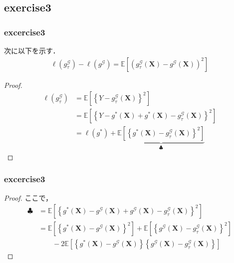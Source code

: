 \documentclass[dvipdfmx,cjk]{beamer}
\theoremstyle{example}
\begin{document}
\subsection{exercise3}
\begin{frame}
    \frametitle{excercise3}
    次に以下を示す．
    \begin{align*}
        \ell(g^\mathcal{G}_\tau)-\ell(g^\mathcal{G})=\mathbb{E}\left[(g^\mathcal{G}_\tau(\boldsymbol{X})-g^\mathcal{G}(\boldsymbol{X}))^2\right]
    \end{align*}
    \begin{proof}
        \begin{align*}
            \ell(g^\mathcal{G}_\tau) & =\mathbb{E}\left[\left\{Y-g^\mathcal{G}_\tau(\boldsymbol{X})\right\}^2\right]                                                             \\
                                     & =\mathbb{E}\left[\left\{Y-g^*(\boldsymbol{X})+g^*(\boldsymbol{X})-g^\mathcal{G}_\tau(\boldsymbol{X})\right\}^2\right]                     \\
                                     & =\ell(g^*)+\underbrace{\mathbb{E}\left[\left\{g^*(\boldsymbol{X})-g^\mathcal{G}_\tau(\boldsymbol{X})\right\}^2\right]}_\text{$\clubsuit$}
        \end{align*}
        \renewcommand{\qedsymbol}{}
    \end{proof}
\end{frame}

\begin{frame}
    \frametitle{excercise3}
    \begin{proof}
        ここで，
        \begin{align*}
            \clubsuit & = \mathbb{E}\left[\left\{g^*(\boldsymbol{X})-g^\mathcal{G}(\boldsymbol{X})+g^\mathcal{G}(\boldsymbol{X})-g^\mathcal{G}_\tau(\boldsymbol{X})\right\}^2\right]                                        \\
                      & =\mathbb{E}\left[\left\{g^*(\boldsymbol{X})-g^\mathcal{G}(\boldsymbol{X})\right\}^2\right]+\mathbb{E}\left[\left\{g^\mathcal{G}(\boldsymbol{X})-g^\mathcal{G}_\tau(\boldsymbol{X})\right\}^2\right] \\
                      & \qquad -2\mathbb{E}\left[\left\{g^*(\boldsymbol{X})-g^\mathcal{G}(\boldsymbol{X})\right\}\left\{g^\mathcal{G}(\boldsymbol{X})-g^\mathcal{G}_\tau(\boldsymbol{X})\right\}\right]
        \end{align*}
    \end{proof}
\end{frame}
\end{document}
